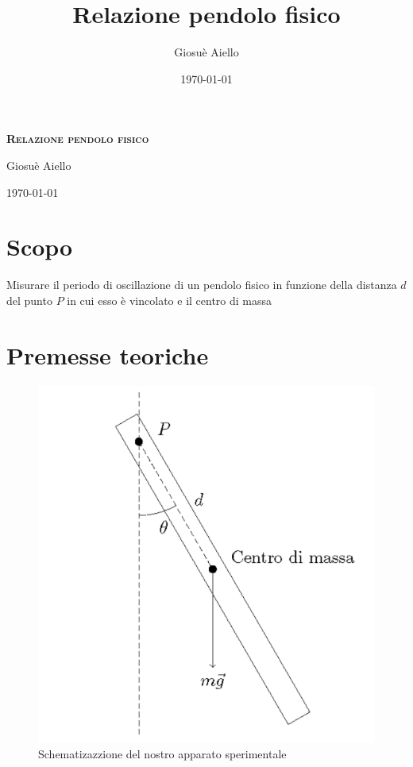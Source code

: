\documentclass{article}
\title{Relazione pendolo fisico}
\author{Giosuè Aiello}
\date{\today}
\begin{document}
\begin{titlingpage}
    \begin{center}
        \vspace*{60pt} %

        {\Huge \textbf{\textsc{Relazione pendolo fisico}}} %
        \vspace{30pt} %

        {\huge{Giosuè Aiello}} %
        \vspace{20pt} %

        {\large \today} %
    \end{center}
    
    \vfill %
\end{titlingpage}

\pagebreak

	\section{Scopo}
	Misurare il periodo di oscillazione di un pendolo fisico in funzione della distanza $d$ del punto $P$ in cui esso è vincolato e il centro di massa 
	\section{Premesse teoriche}

\begin{figure}[h!]
	\centering
	\includegraphics[scale=0.35]{pendolo_fisico.png}
	\caption{Schematizazzione del nostro apparato sperimentale}
	\label{fig:1}
\end{figure}
\end{document}
